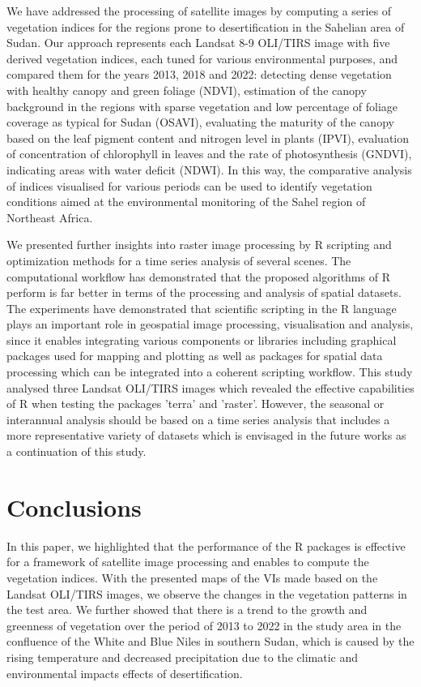 \documentclass[jimaging,article,submit,pdftex,moreauthors]{Definitions/mdpi}
\begin{document}
We have addressed the processing of satellite images by computing a series of vegetation indices for the regions prone to desertification in the Sahelian area of Sudan. Our approach represents each Landsat 8-9 OLI/TIRS image with five derived vegetation indices, each tuned for various environmental purposes, and compared them for the years 2013, 2018 and 2022: detecting dense vegetation with healthy canopy and green foliage (NDVI), estimation of the canopy background in the regions with sparse vegetation and low percentage of foliage coverage as typical for Sudan (OSAVI), evaluating the maturity of the canopy based on the leaf pigment content and nitrogen level in plants (IPVI), evaluation of concentration of chlorophyll in leaves and the rate of photosynthesis (GNDVI), indicating areas with water deficit (NDWI). In this way, the comparative analysis of indices visualised for various periods can be used to identify vegetation conditions aimed at the environmental monitoring of the Sahel region of Northeast Africa.

We presented further insights into raster image processing by R scripting and optimization methods for a time series analysis of several scenes. The computational workflow has demonstrated that the proposed algorithms of R perform is far better in terms of the processing and analysis of spatial datasets. The experiments have demonstrated that scientific scripting in the R language plays an important role in geospatial image processing, visualisation and analysis, since it enables integrating various components or libraries including graphical packages used for mapping and plotting as well as packages for spatial data processing which can be integrated into a coherent scripting workflow. This study analysed three Landsat OLI/TIRS images which revealed the effective capabilities of R when testing the packages 'terra' and 'raster'. However, the seasonal or interannual analysis should be based on a time series analysis that includes a more representative variety of datasets which is envisaged in the future works as a continuation of this study.

\section{Conclusions}

In this paper, we highlighted that the performance of the R packages is effective for a framework of satellite image processing and enables to compute the vegetation indices. With the presented maps of the VIs made based on the Landsat OLI/TIRS images, we observe the changes in the vegetation patterns in the test area. We further showed that there is a trend to the growth and greenness of vegetation over the period of 2013 to 2022 in the study area in the confluence of the White and Blue Niles in southern Sudan, which is caused by the rising temperature and decreased precipitation due to the climatic and environmental impacts effects of desertification.
\end{document}
